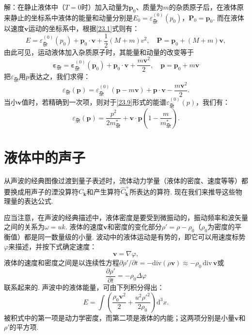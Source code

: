 \begin{xiti}
{\heiti 解：}在静止液体中（$T=0$时）加入动量为$\bm{p}_{0}$、质量为$m$的杂质原子后，在液体原来静止的坐标系中液体的能量和动量分别是$E_{0}=\varepsilon^{(0)}_{\text{杂}}(p_{0})$，$\bm{P}_{0}=\bm{p}_{0}$. 而在液体以速度$\bm{v}$运动的坐标系中，根据\eqref{23.1}式则有：
\begin{equation*}
E=\varepsilon^{(0)}_{\text{杂}}(p_{0})+\bm{p}_{0}\cdot\bm{v}+\frac{1}{2}(M+m)v^{2},\quad
\bm{P}=\bm{p}_{0}+(M+m)\bm{v},
\end{equation*}
由此可见，运动液体加入杂质原子时，其能量和动量的改变等于
\begin{equation*}
\bm{\varepsilon}_{\text{杂}}=\bm{\varepsilon}^{(0)}_{\text{杂}}(\bm{p}_{0})+\bm{p}_{0}\cdot\bm{v}+\frac{m\bm{v}^{2}}{2},\quad
\bm{p}=\bm{p}_{0}+m\bm{v}
\end{equation*}
把$\varepsilon_{\text{杂}}$用$p$表达之，我们求得：
\begin{equation*}
\varepsilon_{\text{杂}}(\bm{p})=\varepsilon^{(0)}_{\text{杂}}(\bm{p}-m\bm{v})+\bm{p}\cdot\bm{v}-\frac{m\bm{v}^{2}}{2}.
\end{equation*}
当小$\bm{v}$值时，若精确到一次项，则对于\eqref{23.9}形式的能谱$\varepsilon^{(0)}_{\text{杂}}(p)$，我们有：
\begin{equation*}
\varepsilon_{\text{杂}}(\bm{p})=\frac{p^{2}}{2m^{*}_{\text{杂}}}+\bm{v}\cdot\bm{p}\left(1-\frac{m}{m^{*}_{\text{杂}}}\right).
\end{equation*}

\end{xiti}

\section{液体中的声子}

从声波的经典图像过渡到量子表述时，流体动力学量（液体的密度、速度等等）都要换成用声子的湮没算符$\hat{C}_{\bm{k}}$和产生算符$\hat{C}^{+}_{\bm{k}}$所表达的算符. 现在我们来推导这些物理量的表达公式.

应当注意，在声波的经典描述中，液体密度是要受到微振动的，振动频率和波矢量之间的关系为$\omega=uk$. 液体的速度$\bm{v}$和密度的变化部分$\rho'=\rho-\rho_{0}$（$\rho_{0}$为密度的平衡值）都是同一数量级的小量. 波动中的液体运动是有势的，即它可以用速度标势$\varphi$来描述，并按下式确定速度：
\begin{equation}
\bm{v}=\nabla\varphi,
\label{24.1}
\end{equation}
液体的速度和密度之间是以连续性方程$\partial\rho'/\partial t=-\mathrm{div}(\rho\bm{v})\approx-\rho_{0}\,\mathrm{div}\,\bm{v}$或
\begin{equation}
\frac{\partial\rho'}{\partial t}=-\rho_{0}\Delta\varphi
\label{24.2}
\end{equation}
联系起来的. 声波中的液体能量，可由下列积分得出：
\begin{equation}
E=\int\left(\frac{\rho_{0}\bm{v}^{2}}{2}+\frac{u^{2}\rho'^{2}}{2\rho_{0}}\right)\mathrm{d}^{3}x.
\label{24.3}
\end{equation}
被积式中的第一项是动力学密度，而第二项是液体的内能；这两项分别是小量$\bm{v}$和$\rho'$的平方项.

